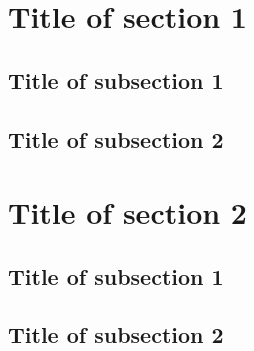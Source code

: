 \section{Title of section 1} \lipsum[1]
\subsection{Title of subsection 1} \lipsum[2-4]
\subsection{Title of subsection 2} \lipsum[2-4]

\section{Title of section 2} \lipsum[1]
\subsection{Title of subsection 1} \lipsum[2-4]
\subsection{Title of subsection 2} \lipsum[2-3]